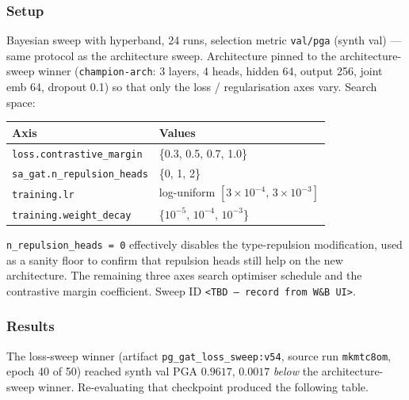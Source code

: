 \subsubsection{Setup}

Bayesian sweep with hyperband, 24 runs, selection metric \texttt{val/pga} (synth val) --- same protocol as the architecture sweep.
Architecture pinned to the architecture-sweep winner (\texttt{champion-arch}: 3 layers, 4 heads, hidden 64, output 256, joint emb 64, dropout 0.1) so that only the loss / regularisation axes vary.
Search space:

\begin{tabular}{ll}
\hline
\textbf{Axis} & \textbf{Values} \\
\hline
\texttt{loss.contrastive\_margin}      & \{0.3, 0.5, 0.7, 1.0\} \\
\texttt{sa\_gat.n\_repulsion\_heads}   & \{0, 1, 2\} \\
\texttt{training.lr}                    & log-uniform $[3\!\times\!10^{-4},\, 3\!\times\!10^{-3}]$ \\
\texttt{training.weight\_decay}         & \{$10^{-5}$, $10^{-4}$, $10^{-3}$\} \\
\hline
\end{tabular}

\vspace{0.5em}

\texttt{n\_repulsion\_heads = 0} effectively disables the type-repulsion modification, used as a sanity floor to confirm that repulsion heads still help on the new architecture.
The remaining three axes search optimiser schedule and the contrastive margin coefficient.
Sweep ID \texttt{<TBD --- record from W\&B UI>}.

\subsubsection{Results}

The loss-sweep winner (artifact \texttt{pg\_gat\_loss\_sweep:v54}, source run \texttt{mkmtc8om}, epoch 40 of 50) reached synth val PGA $0.9617$, $0.0017$ \emph{below} the architecture-sweep winner.
Re-evaluating that checkpoint produced the following table.

